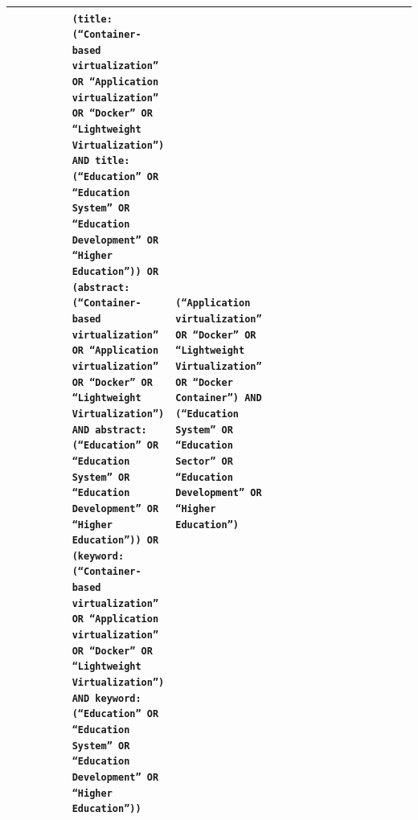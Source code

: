 \begin{table}
\begin{adjustbox}{max width=\textwidth}
\begin{tabular}{|P{0.18\linewidth}|P{0.20\linewidth}|P{0.20\linewidth}|P{0.20\linewidth}|P{0.20\linewidth}|P{0.20\linewidth}|}
& \tiny \texttt{(title:(``Container-based virtualization'' OR ``Application virtualization'' OR ``Docker'' OR ``Lightweight Virtualization'') AND title:(``Education'' OR ``Education System'' OR ``Education Development'' OR ``Higher Education'')) OR (abstract:(``Container-based virtualization'' OR ``Application virtualization'' OR ``Docker'' OR ``Lightweight Virtualization'') AND abstract:(``Education'' OR ``Education System'' OR ``Education Development'' OR ``Higher Education'')) OR (keyword:(``Container-based virtualization'' OR ``Application virtualization'' OR ``Docker'' OR ``Lightweight Virtualization'') AND keyword:(``Education'' OR ``Education System'' OR ``Education Development'' OR ``Higher Education''))} 
& \tiny \texttt{(``Application virtualization'' OR ``Docker'' OR ``Lightweight Virtualization'' OR ``Docker Container'') AND (``Education System'' OR ``Education Sector'' OR ``Education Development'' OR ``Higher Education'')} \\
\hline


\end{tabular}
\end{adjustbox}
\end{table}
